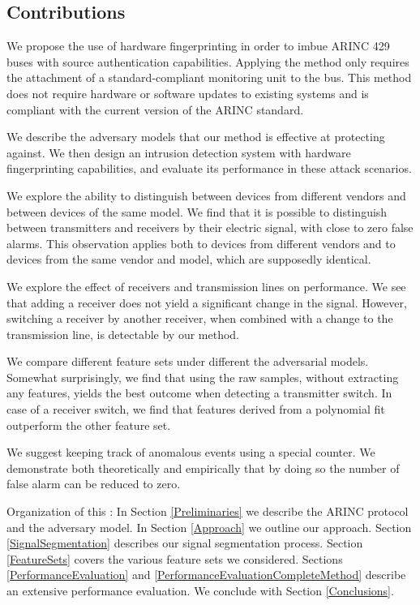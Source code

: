 \documentclass[compsoc,conference,a4paper]{IEEEtran}
\newcommand{\sublevel}[1]{\subsection{#1}}
\newcommand{\sublevel}[1]{\section{#1}}
\begin{document}
\sublevel{Contributions}
  We propose the use of hardware fingerprinting in order to imbue ARINC 429 buses with source authentication capabilities. Applying the method only requires the attachment of a standard-compliant monitoring unit to the bus. This method does not require hardware or software updates to existing systems and is compliant with the current version of the ARINC standard.
  
  We describe the adversary models that our method is effective at protecting against. We then design an intrusion detection system with hardware fingerprinting capabilities, and evaluate its performance in these attack scenarios.
  
  We explore the ability to distinguish between devices from different vendors and between devices of the same model. We find that it is possible to distinguish between transmitters and receivers by their electric signal, with close to zero false alarms. This observation applies both to devices from different vendors and to devices from the same vendor and model, which are supposedly identical.
  
  We explore the effect of receivers and transmission lines on performance. We see that adding a receiver does not yield a significant change in the signal. However, switching a receiver by another receiver, when combined with a change to the transmission line, is detectable by our method.
  
  We compare different feature sets under different the adversarial models. Somewhat surprisingly, we find that using the raw samples, without extracting any features, yields the best outcome when detecting a transmitter switch. In case of a receiver switch, we find that features derived from a polynomial fit outperform the other feature set.
  
  We suggest keeping track of anomalous events using a special counter. We demonstrate both theoretically and empirically that by doing so the number of false alarm can be reduced to zero.
  
  Organization of this \iftoggle{paper} {paper} {work}: In Section \ref{Preliminaries} we describe the ARINC protocol and the adversary model. In Section \ref{Approach} we outline our approach. Section \ref{SignalSegmentation} describes our signal segmentation process. Section \ref{FeatureSets} covers the various feature sets we considered. Sections \ref{PerformanceEvaluation} and \ref{PerformanceEvaluationCompleteMethod} describe an extensive performance evaluation. We conclude with Section \ref{Conclusions}.
  
\end{document}
